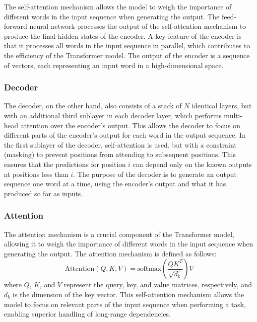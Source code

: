             The self-attention mechanism allows the model to weigh the importance of different words in the input sequence when generating the output. The feed-forward neural network processes the output of the self-attention mechanism to produce the final hidden states of the encoder. A key feature of the encoder is that it processes all words in the input sequence in parallel, which contributes to the efficiency of the Transformer model. The output of the encoder is a sequence of vectors, each representing an input word in a high-dimensional space.

            \subsubsection{Decoder}
                The decoder, on the other hand, also consists of a stack of \(N\) identical layers, but with an additional third sublayer in each decoder layer, which performs multi-head attention over the encoder's output. This allows the decoder to focus on different parts of the encoder's output for each word in the output sequence. In the first sublayer of the decoder, self-attention is used, but with a constraint (masking) to prevent positions from attending to subsequent positions. This ensures that the predictions for position \(i\) can depend only on the known outputs at positions less than \(i\). The purpose of the decoder is to generate an output sequence one word at a time, using the encoder's output and what it has produced so far as inputs.

            \subsubsection{Attention}
                The attention mechanism is a crucial component of the Transformer model, allowing it to weigh the importance of different words in the input sequence when generating the output. The attention mechanism is defined as follows:
                \begin{equation}
                    \text{Attention}(Q, K, V) = \text{softmax}\left(\frac{QK^T}{\sqrt{d_k}}\right)V
                    \label{eq:attention}
                \end{equation}
                where $Q$, $K$, and $V$ represent the query, key, and value matrices, respectively, and $d_k$ is the dimension of the key vector. This self-attention mechanism allows the model to focus on relevant parts of the input sequence when performing a task, enabling superior handling of long-range dependencies.
                
